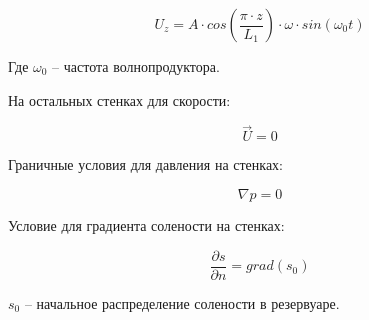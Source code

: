 \begin{equation}
    U_z = A\cdot cos\left(\frac{\pi \cdot z}{L_1}\right)\cdot \omega \cdot  sin(\omega_0 t)
\end{equation}

Где $\omega_0$ -- частота волнопродуктора. 

На остальных стенках для скорости:

\begin{equation}
    \vec{U} = 0
\end{equation}

Граничные условия для давления на стенках:

\begin{equation}
    \nabla p = 0
\end{equation}

Условие для градиента солености на стенках:

\begin{equation}
    \frac{\partial s}{\partial n} = grad(s_0)
\end{equation}

$s_0$ -- начальное распределение солености в резервуаре.

